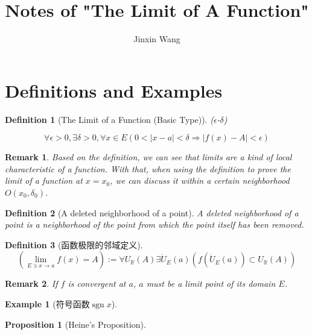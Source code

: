 \documentclass[onecolumn]{ctexart}
\title{Notes of "The Limit of A Function"}
\author{Jinxin Wang}
\date{}
\newtheorem{definition}{Definition}
\newtheorem{proposition}{Proposition}
\newtheorem{remark}{Remark}
\newtheorem{example}{Example}
\DeclareMathOperator{\sgn}{sgn}
\begin{document}
\maketitle

\section{Definitions and Examples}

\begin{definition}[The Limit of a Function (Basic Type)]
  ($\epsilon$-$\delta$)

  \begin{equation}
    \forall \epsilon > 0, \exists \delta > 0, \forall x \in E (0 < |x - a| < \delta \Rightarrow |f(x) - A| < \epsilon)
  \end{equation}
\end{definition}

\begin{remark}
  Based on the definition, we can see that limits are a kind of local 
  characteristic of a function. With that, when using the definition to prove 
  the limit of a function at $x = x_0$, we can discuss it within a certain 
  neighborhood $O(x_0, \delta_0)$.
\end{remark}

\begin{definition}[A deleted neighborhood of a point]
  A deleted neighborhood of a point is a neighborhood of the point from which 
  the point itself has been removed.
\end{definition}

\begin{definition}[函数极限的邻域定义]
  \begin{equation}
    (\lim_{E \owns x \to a} f(x) = A) := \forall U_{\mathbb{R}}(A) \exists \dot{U}_E(a) (f(\dot{U}_E(a)) \subset U_{\mathbb{R}}(A))
  \end{equation}
\end{definition}
\begin{remark}
  If $f$ is convergent at $a$, $a$ must be a limit point of its domain $E$.
\end{remark}

\begin{example}[符号函数$\sgn x$]
  
\end{example}

\begin{proposition}[Heine's Proposition]
  
\end{proposition}
\end{document}
